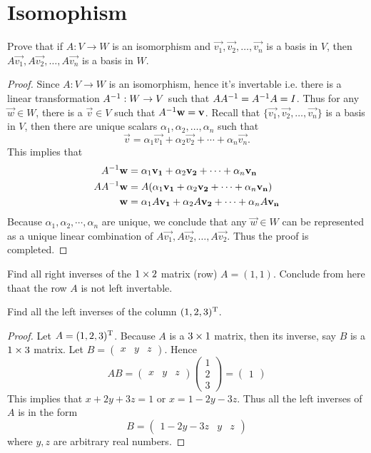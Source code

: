 \section{Isomophism}
\begin{exercise}
  Prove that if $A:V\to W$ is an isomorphism and
  $\vec{v_1},\vec{v_2},\dots,\vec{v_n}$ is a basis in $V$,
  then $A\vec{v_1},A\vec{v_2},\dots,A\vec{v_n}$ is a basis in
  $W$.
\end{exercise}
\begin{proof}
  Since $A:V\to W$ is an isomorphism, hence it's invertable i.e. 
  there is a linear transformation $A^{-1}:W\to V$ such that
  $AA^{-1}=A^{-1} A=I$. Thus for any $\vec{w}\in W$, there is a
  $\vec{v}\in V$ such that $A^{-1}\mathbf{w}=\mathbf{v}$. Recall that
  $\{\vec{v_1},\vec{v_2},\dots,\vec{v_n}\}$ is a basis in $V$, then
  there are unique scalars $\alpha_1,\alpha_2,\dots,\alpha_n$ such that
  \[\vec{v}=\alpha_1\vec{v_1}+\alpha_2\vec{v_2}+\cdots+\alpha_n\vec{v_n}.\]
  This implies that
  \begin{align*}
    A^{-1}\mathbf{w}&=\alpha_1\mathbf{v_1}+\alpha_2\mathbf{v_2}+\cdots+\alpha_n\mathbf{v_n}\\
    AA^{-1}\mathbf{w}&=A(\alpha_1\mathbf{v_1}+\alpha_2\mathbf{v_2}+\cdots+\alpha_n\mathbf{v_n})\\
    \mathbf{w}&=\alpha_1A\mathbf{v_1}+\alpha_2A\mathbf{v_2}+\cdots+\alpha_nA\mathbf{v_n}\\
  \end{align*}
  Because $\alpha_1,\alpha_2,\cdots,\alpha_n$ are unique, we conclude
  that any $\vec{w}\in W$ can be represented as a unique linear combination
  of $A\vec{v_1},A\vec{v_2},\dots,A\vec{v_2}$. Thus the proof is completed.
\end{proof}
\begin{exercise}
  Find all right inverses of the $1\times 2$ matrix (row) $A=(1,1)$.
  Conclude from here thaat the row $A$ is not left invertable.
\end{exercise}
\begin{exercise}
  Find all the left inverses of the column $(1,2,3)^\mathrm{T}$.
\end{exercise}
\begin{proof}
  Let $A=(1,2,3)^\mathrm{T}$. Because $A$ is a $3\times 1$ matrix, then its
  inverse, say $B$ is a $1\times 3$ matrix. Let 
  $B= \begin{pmatrix} x&y&z \end{pmatrix} $. Hence
  \[AB=
    \begin{pmatrix}
      x&y&z
    \end{pmatrix}
    \begin{pmatrix}
      1\\2\\3
    \end{pmatrix}=
    \begin{pmatrix}
      1
    \end{pmatrix}
  \]
  This implies that $x+2y+3z=1$ or $x=1-2y-3z$. Thus all the left
  inverses of $A$ is in the form
  \[B=
    \begin{pmatrix}
      1-2y-3z & y&z
    \end{pmatrix}
  \]
  where $y,z$ are arbitrary real numbers.
\end{proof}
